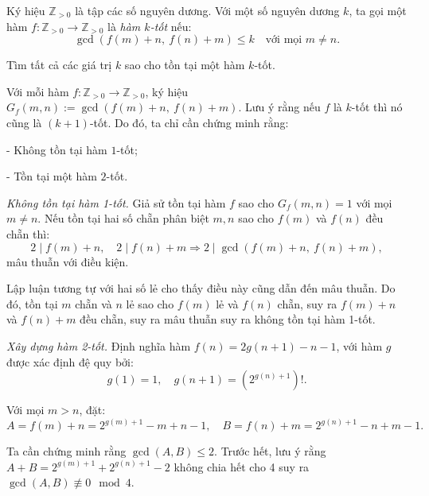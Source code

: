 \ifshowproblemandsoln
\ifshowproblem\begin{problem}\label{problem:IMO-2015-SL-P7}\fi
\ifshowsoln\begin{problem}\fi
    Ký hiệu \( \mathbb{Z}_{>0} \) là tập các số nguyên dương.
    Với một số nguyên dương \( k \), ta gọi một hàm \( f: \mathbb{Z}_{>0} \to \mathbb{Z}_{>0} \) là \textit{hàm \( k \)-tốt} nếu:
    \[
        \gcd(f(m) + n,\ f(n) + m) \le k \quad \text{với mọi } m \ne n.
    \]
    
    Tìm tất cả các giá trị \( k \) sao cho tồn tại một hàm \( k \)-tốt.    
\end{problem}
\fi

\ifshowsoln
\begin{soln}\footnotemark
    Với mỗi hàm \( f : \mathbb{Z}_{>0} \to \mathbb{Z}_{>0} \), ký hiệu \( G_f(m,n) := \gcd(f(m) + n,\ f(n) + m) \).
    Lưu ý rằng nếu \( f \) là \( k \)-tốt thì nó cũng là \( (k+1) \)-tốt. Do đó, ta chỉ cần chứng minh rằng:
    
    - Không tồn tại hàm \( 1 \)-tốt;
    
    - Tồn tại một hàm \( 2 \)-tốt.

    \textit{Không tồn tại hàm 1-tốt.} Giả sử tồn tại hàm \( f \) sao cho \( G_f(m,n) = 1 \) với mọi \( m \ne n \).
    Nếu tồn tại hai số chẵn phân biệt \( m, n \) sao cho \( f(m) \) và \( f(n) \) đều chẵn thì:
    \[
        2 \mid f(m) + n,\quad 2 \mid f(n) + m \Rightarrow 2 \mid \gcd(f(m) + n,\ f(n) + m),
    \]
    mâu thuẫn với điều kiện.
    
    Lập luận tương tự với hai số lẻ cho thấy điều này cũng dẫn đến mâu thuẫn.
    Do đó, tồn tại \( m \) chẵn và \( n \) lẻ sao cho \( f(m) \) lẻ và \( f(n) \) chẵn,
    suy ra \( f(m) + n \) và \( f(n) + m \) đều chẵn, suy ra mâu thuẫn suy ra không tồn tại hàm 1-tốt.

    \textit{Xây dựng hàm 2-tốt.} Định nghĩa hàm \( f(n) = 2g(n+1) - n - 1 \), với hàm \( g \) được xác định đệ quy bởi:
    \[
        g(1) = 1,\quad g(n+1) = \left(2^{g(n) + 1}\right)!.
    \]

    Với mọi \( m > n \), đặt:
    \[
        A = f(m) + n = 2^{g(m)+1} - m + n - 1,\quad B = f(n) + m = 2^{g(n)+1} - n + m - 1.
    \]

    Ta cần chứng minh rằng \( \gcd(A,B) \le 2 \). Trước hết, lưu ý rằng \( A + B = 2^{g(m)+1} + 2^{g(n)+1} - 2 \) không chia hết cho 4
    suy ra \( \gcd(A,B) \not\equiv 0 \mod 4 \).


\end{soln}
\end{problem}
